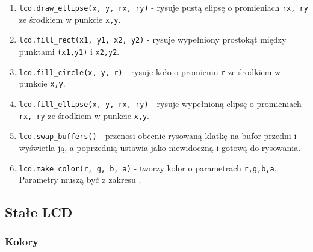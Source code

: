 \documentclass{article}
\begin{document}
\begin{enumerate}
  \item \texttt{lcd.draw\_ellipse(x, y, rx, ry)} - rysuje pustą elipsę o promieniach \texttt{rx, ry} ze środkiem w punkcie \texttt{x,y}.
  \item \texttt{lcd.fill\_rect(x1, y1, x2, y2)} - rysuje wypełniony prostokąt między punktami \texttt{(x1,y1)} i \texttt{x2,y2}.
  \item \texttt{lcd.fill\_circle(x, y, r)} - rysuje koło o promieniu \texttt{r} ze środkiem w punkcie \texttt{x,y}.
  \item \texttt{lcd.fill\_ellipse(x, y, rx, ry)} - rysuje wypełnioną elipsę o promieniach \texttt{rx, ry} ze środkiem w punkcie \texttt{x,y}.
  \item \texttt{lcd.swap\_buffers()} - przenosi obecnie rysowaną klatkę na bufor przedni i wyświetla ją, a poprzednią ustawia jako 
  niewidoczną i gotową do rysowania.
  \item \texttt{lcd.make\_color(r, g, b, a)} - tworzy kolor o parametrach \texttt{r,g,b,a}. Parametry muszą być z zakresu \texttt{\big[0.0; 1.0\big]}.
\end{enumerate}

\subsection{Stałe LCD}

\subsubsection{Kolory}
\end{document}
